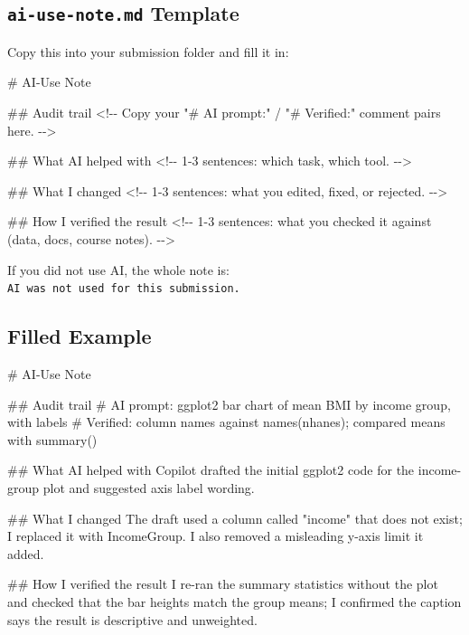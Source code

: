 \documentclass[
  letterpaper,
  DIV=11,
  numbers=noendperiod,
  oneside]{scrreprt}
\newenvironment{Shaded}{\begin{snugshade}}{\end{snugshade}}
\newcommand{\CommentTok}[1]{\textcolor[rgb]{0.37,0.37,0.37}{#1}}
\newcommand{\FunctionTok}[1]{\textcolor[rgb]{0.28,0.35,0.67}{#1}}
\newcommand{\NormalTok}[1]{\textcolor[rgb]{0.00,0.23,0.31}{#1}}
\begin{document}
\subsection*{\texorpdfstring{\texttt{ai-use-note.md}
Template}{ai-use-note.md Template}}\label{ai-use-note.md-template}

Copy this into your submission folder and fill it in:

\begin{Shaded}
\begin{Highlighting}[numbers=left,,]
\FunctionTok{\# AI{-}Use Note}

\FunctionTok{\#\# Audit trail}
\CommentTok{\textless{}!{-}{-} Copy your "\# AI prompt:" / "\# Verified:" comment pairs here. {-}{-}\textgreater{}}

\FunctionTok{\#\# What AI helped with}
\CommentTok{\textless{}!{-}{-} 1{-}3 sentences: which task, which tool. {-}{-}\textgreater{}}

\FunctionTok{\#\# What I changed}
\CommentTok{\textless{}!{-}{-} 1{-}3 sentences: what you edited, fixed, or rejected. {-}{-}\textgreater{}}

\FunctionTok{\#\# How I verified the result}
\CommentTok{\textless{}!{-}{-} 1{-}3 sentences: what you checked it against (data, docs, course notes). {-}{-}\textgreater{}}
\end{Highlighting}
\end{Shaded}

If you did not use AI, the whole note is:
\texttt{AI\ was\ not\ used\ for\ this\ submission.}

\subsection*{Filled Example}\label{filled-example}

\begin{Shaded}
\begin{Highlighting}[numbers=left,,]
\FunctionTok{\# AI{-}Use Note}

\FunctionTok{\#\# Audit trail}
\FunctionTok{\# AI prompt: ggplot2 bar chart of mean BMI by income group, with labels}
\FunctionTok{\# Verified: column names against names(nhanes); compared means with summary()}

\FunctionTok{\#\# What AI helped with}
\NormalTok{Copilot drafted the initial ggplot2 code for the income{-}group plot and}
\NormalTok{suggested axis label wording.}

\FunctionTok{\#\# What I changed}
\NormalTok{The draft used a column called "income" that does not exist; I replaced it}
\NormalTok{with IncomeGroup. I also removed a misleading y{-}axis limit it added.}

\FunctionTok{\#\# How I verified the result}
\NormalTok{I re{-}ran the summary statistics without the plot and checked that the bar}
\NormalTok{heights match the group means; I confirmed the caption says the result is}
\NormalTok{descriptive and unweighted.}
\end{Highlighting}
\end{Shaded}
\end{document}

